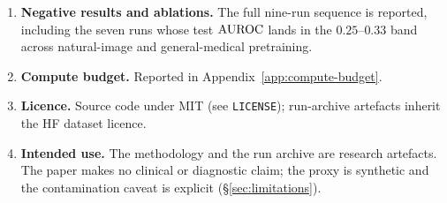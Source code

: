 \begin{enumerate}[leftmargin=2em]
      to . The paper Makefile
      runs  before PDF and arXiv-package
      builds, checking the locked values against the run-archive mirror.
\item \textbf{Negative results and ablations.} The full nine-run
      sequence is reported, including the seven runs whose test $\mathrm{AUROC}$
      lands in the $0.25$--$0.33$ band across natural-image and
      general-medical pretraining.
\item \textbf{Compute budget.} Reported in
      Appendix~\ref{app:compute-budget}.
\item \textbf{Licence.} Source code under MIT (see \texttt{LICENSE});
      run-archive artefacts inherit the HF dataset licence.
\item \textbf{Intended use.} The methodology and the run archive are
      research artefacts. The paper makes no clinical or diagnostic
      claim; the proxy is synthetic and the contamination caveat is
      explicit (\S\ref{sec:limitations}).
\end{enumerate}
